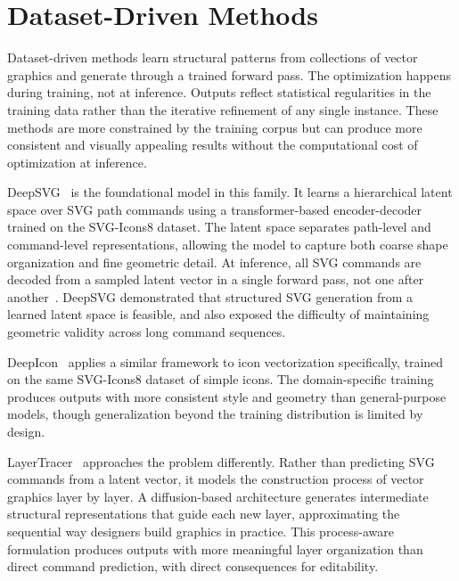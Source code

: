 \section{Dataset-Driven Methods}
\label{sec:datasetdriven}

Dataset-driven methods learn structural patterns from collections of vector graphics
and generate through a trained forward pass. The
optimization happens during training, not at inference.
Outputs reflect statistical regularities in the training
data rather than the iterative refinement of any single
instance. These methods are more constrained by the training corpus
but can produce more consistent and visually appealing results
without the computational cost of optimization at inference.

DeepSVG~\cite{carlierDeepSVGHierarchicalGenerative2020}
is the foundational model in this family. It learns a
hierarchical latent space over SVG path commands using
a transformer-based encoder-decoder trained on the
SVG-Icons8 dataset.
The latent space separates path-level and command-level
representations, allowing the model to capture both coarse
shape organization and fine geometric detail. At inference,
all SVG commands are decoded from a sampled latent vector
in a single forward pass, not one after another~\cite{carlierDeepSVGHierarchicalGenerative2020}. DeepSVG demonstrated that structured SVG
generation from a learned latent space is feasible, and
also exposed the difficulty of maintaining geometric
validity across long command sequences.

DeepIcon~\cite{bingDeepIconHierarchicalNetwork2024} applies a similar framework
to icon vectorization specifically, trained on the same
SVG-Icons8 dataset of simple icons. The domain-specific training
produces outputs with more consistent style and geometry
than general-purpose models, though generalization beyond
the training distribution is limited by design.

LayerTracer~\cite{songLayerTracerCognitiveAlignedLayered2025} approaches the problem
differently. Rather than predicting SVG commands from a
latent vector, it models the construction process of
vector graphics layer by layer. A diffusion-based
architecture generates intermediate structural
representations that guide each new layer, approximating
the sequential way designers build graphics in practice.
This process-aware formulation produces outputs with more
meaningful layer organization than direct command
prediction, with direct consequences for editability.

